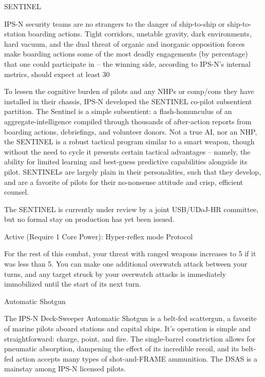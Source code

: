                                                          SENTINEL


  IPS-N security teams are no strangers to the danger of ship-to-ship or ship-to-station boarding actions.
   Tight corridors, unstable gravity, dark environments, hard vacuum, and the dual threat of organic and
  inorganic opposition forces make boarding actions some of the most deadly engagements (by
  percentage) that one could participate in -- the winning side, according to IPS-N’s internal metrics,
  should expect at least 30%

   To lessen the cognitive burden of pilots and any NHPs or comp/cons they have installed in their chassis,
  IPS-N developed the SENTINEL co-pilot subsentient partition. The Sentinel is a simple subsentient: a
  flash-homunculus of an aggregate-intelligence compiled through thousands of after-action reports from
  boarding actions, debriefings, and volunteer donors. Not a true AI, nor an NHP, the SENTINEL is a
  robust tactical program similar to a smart weapon, though without the need to cycle it presents certain
  tactical advantages -- namely, the ability for limited learning and best-guess predictive capabilities
  alongside its pilot. SENTINELs are largely plain in their personalities, such that they develop, and are a
  favorite of pilots for their no-nonsense attitude and crisp, efficient counsel.

   The SENTINEL is currently under review by a joint USB/UDoJ-HR committee, but no formal stay on
  production has yet been issued.

  Active (Require 1 Core Power): Hyper-reflex mode
   Protocol

   For the rest of this combat, your threat with ranged weapons increases to 5 if it was less than 5. You
  can make one additional overwatch attack between your turns, and any target struck by your
  overwatch attacks is immediately immobilized until the start of its next turn.

Automatic Shotgun

The IPS-N Deck-Sweeper Automatic Shotgun is a belt-fed scattergun, a favorite of marine pilots aboard stations and
capital ships. It’s operation is simple and straightforward: charge, point, and fire. The single-barrel constriction allows
for pneumatic absorption, dampening the effect of its incredible recoil, and its belt-fed action accepts many types of
shot-and-FRAME ammunition.
The DSAS is a mainstay among IPS-N licensed pilots.

